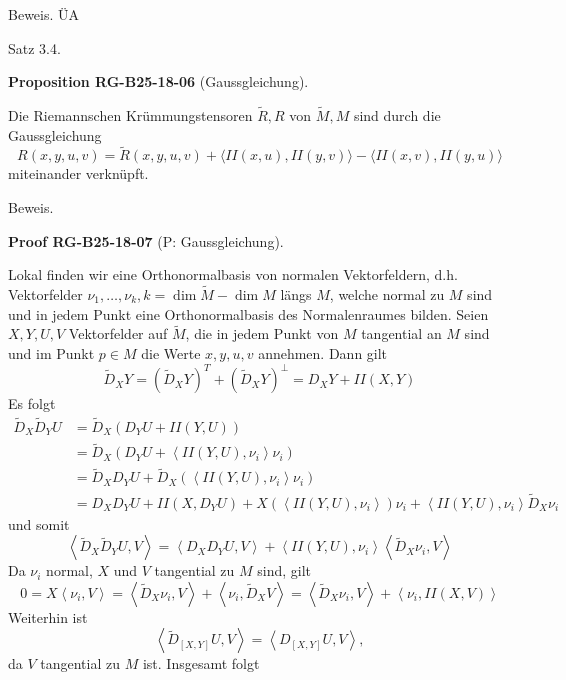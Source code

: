 \documentclass[10pt, letterpaper]{article}
\newcommand{\CustomHeading}[3]{%
  \par\medskip\noindent%
  \textbf{#1 #2} \textnormal{(#3)}.\enskip%
}
\newenvironment{PROP}[2]{\begin{unitbox}\CustomHeading{Proposition}{#1}{#2}}{\end{unitbox}}
\newenvironment{PROOF}[2]{\begin{unitbox}\CustomHeading{Proof}{#1}{#2}}{\end{unitbox}}
\begin{document}
Beweis. ÜA



Satz 3.4. 

\begin{PROP}{RG-B25-18-06}{Gaussgleichung}
Die Riemannschen Krümmungstensoren $\tilde{R}, R$ von $\tilde{M}, M$ sind durch die Gaussgleichung
$$
R(x, y, u, v)=\tilde{R}(x, y, u, v)+\langle I I(x, u), I I(y, v)\rangle-\langle I I(x, v), I I(y, u)\rangle
$$
miteinander verknüpft.
\end{PROP}


Beweis. 



\begin{PROOF}{RG-B25-18-07}{P: Gaussgleichung}
Lokal finden wir eine Orthonormalbasis von normalen Vektorfeldern, d.h. Vektorfelder $\nu_{1}, \ldots, \nu_{k}, k=\operatorname{dim} \tilde{M}-\operatorname{dim} M$ längs $M$, welche normal zu $M$ sind und in jedem Punkt eine Orthonormalbasis des Normalenraumes bilden. Seien $X, Y, U, V$ Vektorfelder auf $\tilde{M}$, die in jedem Punkt von $M$ tangential an $M$ sind und im Punkt $p \in M$ die Werte $x, y, u, v$ annehmen. Dann gilt
$$
\tilde{D}_{X} Y=\left(\tilde{D}_{X} Y\right)^{T}+\left(\tilde{D}_{X} Y\right)^{\perp}=D_{X} Y+I I(X, Y)
$$
Es folgt
$$
\begin{aligned}
\tilde{D}_{X} \tilde{D}_{Y} U & =\tilde{D}_{X}\left(D_{Y} U+I I(Y, U)\right) \\
& =\tilde{D}_{X}\left(D_{Y} U+\left\langle I I(Y, U), \nu_{i}\right\rangle \nu_{i}\right) \\
& =\tilde{D}_{X} D_{Y} U+\tilde{D}_{X}\left(\left\langle I I(Y, U), \nu_{i}\right\rangle \nu_{i}\right) \\
& = D_X D_Y U+I I\left(X, D_Y U\right)+X\left(\left\langle I I(Y, U), \nu_i\right\rangle\right) \nu_i+\left\langle I I(Y, U), \nu_i\right\rangle \tilde{D}_X \nu_i
\end{aligned}
$$
und somit
$$\left\langle\tilde{D}_X \tilde{D}_Y U, V\right\rangle=\left\langle D_X D_Y U, V\right\rangle+\left\langle I I(Y, U), \nu_i\right\rangle\left\langle\tilde{D}_X \nu_i, V\right\rangle$$
Da $\nu_{i}$ normal, $X$ und $V$ tangential zu $M$ sind, gilt
$$
0=X\left\langle\nu_{i}, V\right\rangle=\left\langle\tilde{D}_{X} \nu_{i}, V\right\rangle+\left\langle\nu_{i}, \tilde{D}_{X} V\right\rangle=\left\langle\tilde{D}_{X} \nu_{i}, V\right\rangle+\left\langle\nu_{i}, I I(X, V)\right\rangle
$$
Weiterhin ist
$$
\left\langle\tilde{D}_{[X, Y]} U, V\right\rangle=\left\langle D_{[X, Y]} U, V\right\rangle,
$$
da $V$ tangential zu $M$ ist. Insgesamt folgt

\end{PROOF}
\end{document}
